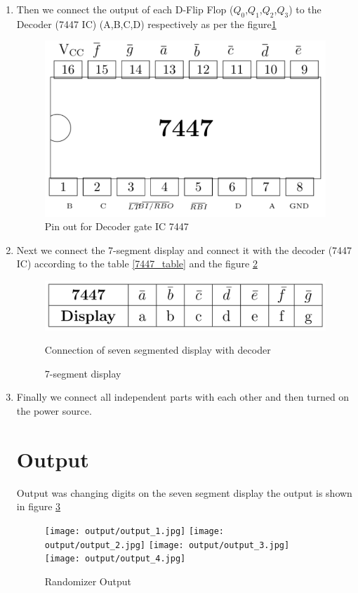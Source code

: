 \documentclass[journal,12pt,twocolumn]{IEEEtran}
\begin{document}
\begin{enumerate}
	\item Then we connect the output of each D-Flip Flop ($Q_0$,$Q_1$,$Q_2$,$Q_3$) to the Decoder (7447 IC) (A,B,C,D) respectively as per the figure\ref{7447}
	\begin{figure}[h]
		\includegraphics[width=\columnwidth]{figs/7447.png}
		\caption{Pin out for Decoder gate IC 7447}
		\label{7447}
	\end{figure}

	\item Next we connect the 7-segment display and connect it with the decoder (7447 IC) according to the table \ref{7447_table} and the figure \ref{Display}
	\begin{figure}[h]
		\includegraphics[scale = 0.2]{figs/7447_disp.png}
		\caption{Connection of seven segmented display with decoder}
		\label{7447_table}
		
        \caption{7-segment display}
		\label{Display}
	\end{figure}

	\item Finally we connect all independent parts with each other and then turned on the power source.

\section*{Output} 
	Output was changing digits on the seven segment display the output is shown in figure \ref{output}
	\begin{figure}
		\texttt{[image: output/output\_1.jpg]}
        \texttt{[image: output/output\_2.jpg]}
        \texttt{[image: output/output\_3.jpg]}
        \texttt{[image: output/output\_4.jpg]}
		\caption{Randomizer Output}
		\label{output}
	\end{figure}
	
\end{enumerate}
\end{document}
